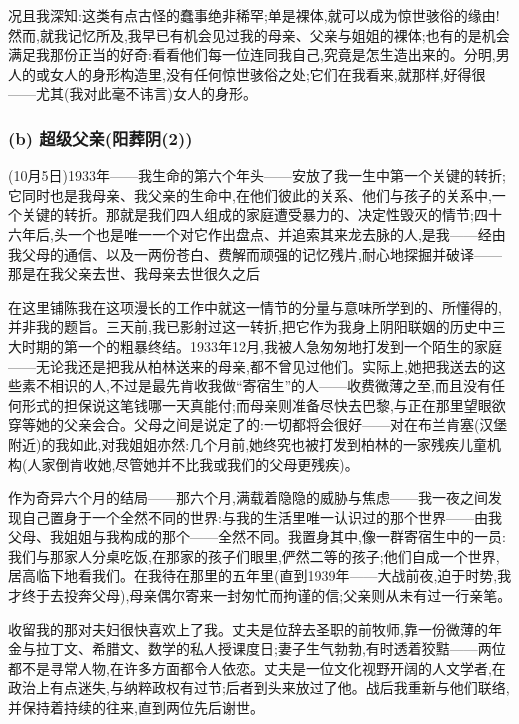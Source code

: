 \dmark{}况且我深知:这类有点古怪的蠢事绝非稀罕;单是裸体,就可以成为惊世骇俗的缘由!然而,就我记忆所及,我早已有机会见过我的母亲、父亲与姐姐的裸体;也有的是机会满足我那份正当的好奇:看看他们每一位连同我自己,究竟是怎生造出来的。分明,男人的或女人的身形构造里,没有任何惊世骇俗之处;它们在我看来,就那样,好得很——尤其(我对此毫不讳言)女人的身形。

\subsubsection*{(b) 超级父亲(阳葬阴(2))}
\label{ch18:local:h8}

\label{ch18:local:n6}

(10月5日)1933年——我生命的第六个年头——安放了我一生中第一个关键的转折;它同时也是我母亲、我父亲的生命中,在他们彼此的关系、他们与孩子的关系中,一个关键的转折。那就是我们四人组成的家庭遭受暴力的、决定性毁灭的情节;四十六年后,头一个也是唯一一个对它作出盘点、并追索其来龙去脉的人,是我——经由我父母的通信、以及一两份苍白、费解而顽强的记忆残片,耐心地探掘并破译——那是在我父亲去世、我母亲去世很久之后

在这里铺陈我在这项漫长的工作中就这一情节的分量与意味所学到的、所懂得的,并非我的题旨。三天前,我已影射过这一转折,把它作为我身上阴阳联姻的历史中三大时期的第一个的粗暴终结。1933年12月,我被人急匆匆地打发到一个陌生的家庭——无论我还是把我从柏林送来的母亲,都不曾见过他们。实际上,她把我送去的这些素不相识的人,不过是最先肯收我做“寄宿生”的人——收费微薄之至,而且没有任何形式的担保说这笔钱哪一天真能付;而母亲则准备尽快去巴黎,与正在那里望眼欲穿等她的父亲会合。\dmark{}父母之间是说定了的:一切都将会很好——对在布兰肯塞(汉堡附近)的我如此,对我姐姐亦然:几个月前,她终究也被打发到柏林的一家残疾儿童机构(人家倒肯收她,尽管她并不比我或我们的父母更残疾)。

作为奇异六个月的结局——那六个月,满载着隐隐的威胁与焦虑——我一夜之间发现自己置身于一个全然不同的世界:与我的生活里唯一认识过的那个世界——由我父母、我姐姐与我构成的那个——全然不同。我置身其中,像一群寄宿生中的一员:我们与那家人分桌吃饭,在那家的孩子们眼里,俨然二等的孩子;他们自成一个世界,居高临下地看我们。在我待在那里的五年里(直到1939年——大战前夜,迫于时势,我才终于去投奔父母),母亲偶尔寄来一封匆忙而拘谨的信;父亲则从未有过一行亲笔。

收留我的那对夫妇很快喜欢上了我。丈夫是位辞去圣职的前牧师,靠一份微薄的年金与拉丁文、希腊文、数学的私人授课度日;妻子生气勃勃,有时透着狡黠——两位都不是寻常人物,在许多方面都令人依恋。丈夫是一位文化视野开阔的人文学者,在政治上有点迷失,与纳粹政权有过节;后者到头来放过了他。战后我重新与他们联络,并保持着持续的往来,直到两位先后谢世。

